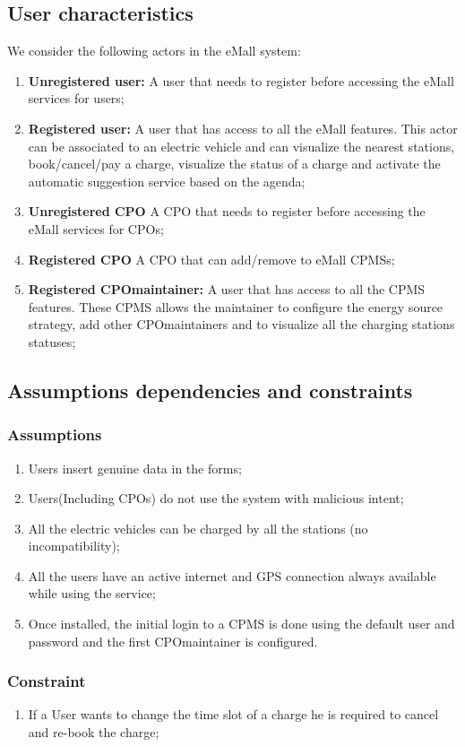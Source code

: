 \subsection{User characteristics}
We consider the following actors in the \ac{eMall} system:
\begin{enumerate}[label=\textbf{A\arabic*}]
      \item \textbf{Unregistered user:} A user that needs to register before accessing the \ac{eMall} services for users;
      \item \textbf{Registered user:} A user that has access to all the \ac{eMall} features.
            This actor can be associated to an electric vehicle and can visualize the nearest stations, book/cancel/pay a charge, visualize the status of a charge and activate the automatic suggestion service based on the agenda;
      \item \textbf{Unregistered \ac{CPO}} A \ac{CPO} that needs to register before accessing the \ac{eMall} services for \acp{CPO};
      \item \textbf{Registered \ac{CPO}} A \ac{CPO} that can add/remove to \ac{eMall} \acp{CPMS};
      \item \textbf{Registered \ac{CPO}maintainer:} A user that has access to all the \ac{CPMS} features.
            These \ac{CPMS} allows the maintainer to configure the energy source strategy, add other \ac{CPO}maintainers and to visualize all the charging stations statuses;
\end{enumerate}

\subsection{Assumptions dependencies and constraints}
\subsubsection{Assumptions}
\begin{enumerate}[label=\textbf{DA\arabic*}]
      \item Users insert genuine data in the forms;
      \item Users(Including CPOs) do not use the system with malicious intent;
      \item All the electric vehicles can be charged by all the stations (no incompatibility);
      \item All the users have an active internet and GPS connection always available while using the service;
      \item Once installed, the initial login to a \ac{CPMS} is done using the default user and password and the first \ac{CPO}maintainer is configured.
\end{enumerate}
\subsubsection{Constraint}
\begin{enumerate}[label=\textbf{C\arabic*}]
      \item If a User wants to change the time slot of a charge he is required to cancel and re-book the charge;
\end{enumerate}

\clearpage